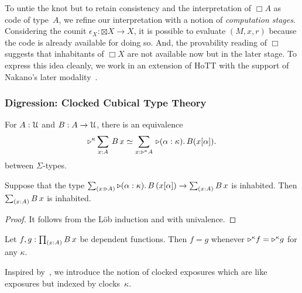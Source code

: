 \documentclass[a4paper,UKenglish,numberwithinsect,cleveref,thm-restate]{lipics-v2021}
\numberwithin{equation}{section}
\theoremstyle{plain}
\begin{document}
To untie the knot but to retain consistency and the interpretation of $\Box A$ as code of type~$A$, we refine our interpretation with a notion of \emph{computation stages}. 
Considering the counit $\epsilon_X\colon \boxtimes X \to X$, it is possible to evaluate $(M, x, r)$ because the code is already available for doing so.
And, the provability reading of $\Box$ suggests that inhabitants of $\Box X$ are not available now but in the later stage.
To express this idea cleanly, we work in an extension of HoTT with the support of Nakano's later modality~\cite{Nakano2000}.

\subsubsection{Digression: Clocked Cubical Type Theory}

\begin{lemma}\label{lem:later-sum}
  For $A : \mathcal{U}$ and $B : A \to \mathcal{U}$, there is an equivalence
  \begin{equation}\label{eq:later-sum}
    \eqv{\laterp^\kappa \sm{x : A} B\,x}{\sm{x : \laterp^\kappa A} \laterp (\alpha : \kappa).\, B (x [\alpha])}.
  \end{equation}
  between $\Sigma$-types.
\end{lemma}

\begin{corollary} \label{coro:lob-induction-sum}
  Suppose that the type $\sm{x : \laterp A} \laterp (\alpha : \kappa).\,B\,(x[\alpha]) \to \sm{x : A} B\,x$ is inhabited.
  Then $\sm{x : A} B\,x$ is inhabited.
\end{corollary}
\begin{proof}
  It follows from the Löb induction and  with univalence.
\end{proof}

\begin{lemma}\label{lem:later-identity}
  Let $f, g : \prd{x : A} B\,x$ be dependent functions.
  Then $f = g$ whenever $\mathord{\triangleright}^\kappa f = \mathord{\triangleright}^\kappa g$ for any $\kappa$. 
\end{lemma}

Inspired by~, we introduce the notion of clocked exposures which are like exposures but indexed by clocks~$\kappa$.
\end{document}
